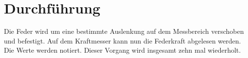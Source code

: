 \section{Durchführung}
\label{sec:Durchführung}

Die Feder wird um eine bestimmte Auslenkung auf dem Messbereich verschoben und befestigt. Auf dem Kraftmesser kann  nun die Federkraft abgelesen werden. Die Werte werden notiert. Dieser Vorgang wird insgesamt zehn mal wiederholt.
